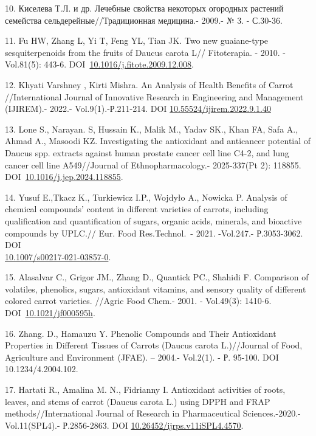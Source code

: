 \begin{refs}
10. Киселева Т.Л. и др. Лечебные свойства некоторых огородных растений
семейства сельдерейные//Традиционная медицина.- 2009.- № 3. - С.30-36.

11. Fu HW, Zhang L, Yi T, Feng YL, Tian JK. Two new guaiane-type
sesquiterpenoids from the fruits of Daucus carota L// Fitoterapia. -
2010. -Vol.81(5): 443-6.
DOI~\href{https://doi.org/10.1016/j.fitote.2009.12.008}{10.1016/j.fitote.2009.12.008}.

12. Khyati Varshney , Kirti Mishra. An Analysis of Health Benefits of
Carrot //International Journal of Innovative Research in Engineering and
Management (IJIREM).- 2022.- Vol.9(1).-Р.211-214. DOI
\href{http://dx.doi.org/10.55524/ijirem.2022.9.1.40}{10.55524/ijirem.2022.9.1.40}

13. Lone S., Narayan. S, Hussain K., Malik M., Yadav SK., Khan FA, Safa
A., Ahmad A., Masoodi KZ. Investigating the antioxidant and anticancer
potential of Daucus spp. extracts against human prostate cancer cell
line C4-2, and lung cancer cell line A549//Journal of
Ethnopharmacology.- 2025-337(Pt 2): 118855.
DOI~\href{https://doi.org/10.1016/j.jep.2024.118855}{10.1016/j.jep.2024.118855}.

14. Yusuf E.,Tkacz K., Turkiewicz I.P., Wojdyło A., Nowicka P. Analysis
of chemical compounds' content in different varieties of carrots,
including qualification and quantification of sugars, organic acids,
minerals, and bioactive compounds by UPLC.// Eur. Food Res.Technol.~-
2021. -Vol.247.- Р.3053-3062. DOI\\
\href{https://link.springer.com/article/10.1007\%2Fs00217-021-03857-0}{10.1007/s00217-021-03857-0}.

15. Alasalvar C., Grigor JM., Zhang D., Quantick PC., Shahidi F.
Comparison of volatiles, phenolics, sugars, antioxidant vitamins, and
sensory quality of different colored carrot varieties. //Agric Food
Chem.- 2001. - Vol.49(3): 1410-6.
DOI~\href{https://doi.org/10.1021/jf000595h}{10.1021/jf000595h}.

16. Zhang. D., Hamauzu Y. Phenolic Compounds and Their Antioxidant
Properties in Different Tissues of Carrots (Daucus carota L.)//Journal
of Food, Agriculture and Environment (JFAE). -- 2004.- Vol.2(1). - Р.
95-100. DOI 10.1234/4.2004.102.

17. Hartati R., Amalina M. N., Fidrianny I. Antioxidant activities of
roots, leaves, and stems of carrot (Daucus carota L.) using DPPH and
FRAP methods//International Journal of Research in Pharmaceutical
Sciences.-2020.-Vol.11(SPL4).- Р.2856-2863. DOI
\href{http://dx.doi.org/10.26452/ijrps.v11iSPL4.4570}{10.26452/ijrps.v11iSPL4.4570}.


\end{refs}
